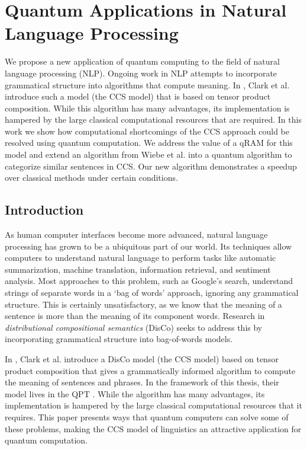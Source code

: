 \chapter{Quantum Applications in Natural Language Processing}
\label{chap:qDisCo}

\begin{chapabstract}
        We propose a new application of quantum computing to the field of natural language processing (NLP).  Ongoing work in NLP attempts to incorporate grammatical structure into algorithms that compute meaning.  In \cite{clark2008compositional}, Clark et al. introduce such a model (the CCS model) that is based on tensor product composition. While this algorithm has many advantages, its implementation is hampered by the large classical computational resources that are required. In this work we show how computational shortcomings of the  CCS approach could be resolved using quantum computation. We address the value of a qRAM \cite{giovannetti2008quantum} for this model and extend an algorithm from Wiebe et al. \cite{wiebe2014quantum} into a quantum algorithm to categorize similar sentences in CCS. Our new algorithm demonstrates a speedup over classical methods under certain conditions.
\end{chapabstract}

\section{Introduction}

As human computer interfaces become more advanced, natural language processing has grown to be a ubiquitous part of our world.  Its techniques allow computers to understand natural language to perform tasks like automatic summarization, machine translation, information retrieval, and sentiment analysis. Most approaches to this problem, such as Google's search, understand strings of separate words in a `bag of words' approach, ignoring any grammatical structure. This is certainly unsatisfactory, as we know that the meaning of a sentence is more than the meaning of its component words. Research in \textit{distributional compositional semantics} (DisCo) seeks to address this by incorporating grammatical structure into bag-of-words models. 

In \cite{clark2008compositional}, Clark et al. introduce a DisCo model (the CCS model) based on tensor product composition that gives a grammatically informed algorithm to compute the meaning of sentences and phrases. In the framework of this thesis, their model lives in the QPT . While the algorithm has many advantages, its implementation is hampered by the large classical computational resources that it requires.  This paper presents ways that quantum computers can solve some of these problems, making the CCS model of linguistics an attractive application for quantum computation.

